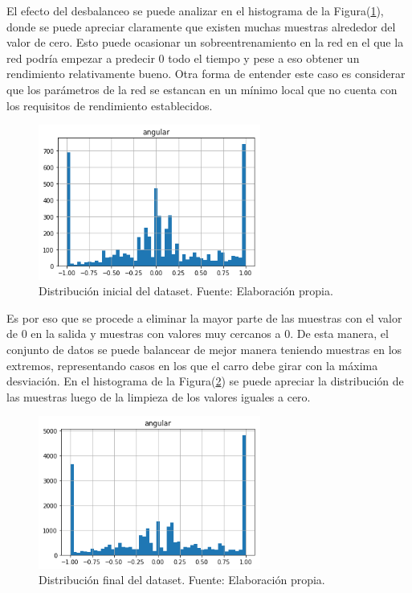         El efecto del desbalanceo se puede analizar en el histograma de la Figura(\ref{fig:histinicial}), donde se puede apreciar claramente 
        que existen muchas muestras alrededor del valor de cero. Esto puede ocasionar un sobreentrenamiento en la red en el que 
        la red podría empezar a predecir 0 todo el tiempo y pese a eso obtener un rendimiento relativamente bueno. Otra forma 
        de entender este caso es considerar que los parámetros de la red se estancan en un mínimo local que no cuenta con 
        los requisitos de rendimiento establecidos. 


        \begin{figure}[!h] 
            \centering
            \includegraphics[width=0.65\textwidth]{img/histinicial}
            \caption[Distribución inicial del dataset]{Distribución inicial del dataset. Fuente: Elaboración propia. }
            \label{fig:histinicial}
        \end{figure}

        Es por eso que se procede a eliminar la mayor parte de las muestras con el valor de 0 en la salida y muestras con valores 
        muy cercanos a 0. De esta manera, el conjunto de datos se puede balancear de mejor manera teniendo muestras en los 
        extremos, representando casos en los que el carro debe girar con la máxima desviación. En el histograma de la Figura(\ref{fig:histfinal}) 
        se puede apreciar la distribución de las muestras luego de la limpieza de los valores iguales a cero. 
        
         \begin{figure}[!h] 
            \centering
            \includegraphics[width=0.65\textwidth]{img/histfinal}
            \caption[Distribución final del dataset]{Distribución final del dataset. Fuente: Elaboración propia. }
            \label{fig:histfinal}
        \end{figure}

